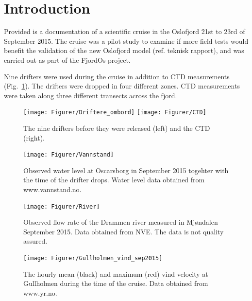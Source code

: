 \documentclass[12pt,a4paper,english]{article}
\begin{document}
\clearpage
\tableofcontents

\clearpage

\section{Introduction}
Provided is a documentation of a scientific cruise in the Oslofjord 21st to 23rd of September 2015. The cruise was a pilot study to examine if more field tests would benefit the validation of the new Oslofjord model (ref. teknisk rapport), and was carried out as part of the FjordOs project.


Nine drifters were used during the cruise in addition to CTD measurements (Fig.~\ref{fig:Utstyr}). The drifters were dropped in four different zones. CTD measurements were taken along three different transects across the fjord. %

\begin{figure}[b]
\centerline{
\texttt{[image: Figurer/Driftere\_ombord]}
\texttt{[image: Figurer/CTD]}
}
\caption{\small
The nine drifters before they were released (left) and the CTD (right).}
\label{fig:Utstyr}
\end{figure}

\begin{figure}[tb]
\centerline{
\texttt{[image: Figurer/Vannstand]}}
\caption{\small
Observed water level at Oscarsborg in September 2015 togehter with the time of the drifter drops. Water level data obtained from www.vannstand.no.}
\label{fig:Waterlevel}
\end{figure}

\begin{figure}[tb]
\centerline{
\texttt{[image: Figurer/River]}}
\caption{\small
Observed flow rate of the Drammen river measured in Mj\o ndalen September 2015. Data obtained from NVE. The data is not quality assured.}
\label{fig:River}
\end{figure}

\begin{figure}[tb]
\centerline{
\texttt{[image: Figurer/Gullholmen\_vind\_sep2015]}}
\caption{\small
The hourly mean (black) and maximum (red) vind velocity at Gullholmen during the time of the cruise. Data obtained from www.yr.no.}
\label{fig:Wind}
\end{figure}
\end{document}

